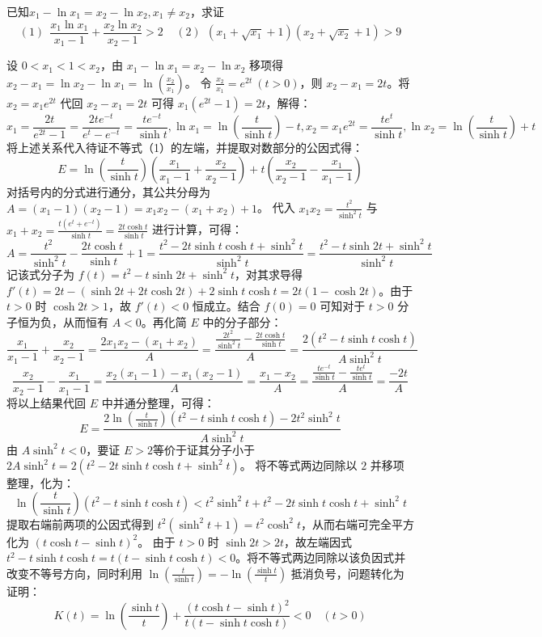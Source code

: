 \newpage
\begin{example}[交点比较]
    已知$x_1-\ln x_1=x_2-\ln x_2,x_1\neq x_2$，求证\[(1)~~\frac{x_{1}\ln x_{1}}{x_{1}-1}+\frac{x_{2}\ln x_{2}}{x_{2}-1}>2~~~~~(2)~~ (x_1+\sqrt{x_1}+1)(x_2+\sqrt{x_2}+1)>9\]
\end{example}
\begin{solution}
设 $0 < x_1 < 1 < x_2$，由 $x_1 - \ln x_1 = x_2 - \ln x_2$ 移项得 $x_2 - x_1 = \ln x_2 - \ln x_1 = \ln\left(\frac{x_2}{x_1}\right)$。
令 $\frac{x_2}{x_1} = e^{2t}\ (t>0)$，则 $x_2 - x_1 = 2t$。将 $x_2 = x_1 e^{2t}$ 代回 $x_2 - x_1 = 2t$ 可得 $x_1(e^{2t}-1) = 2t$，解得：
\[ x_1 = \frac{2t}{e^{2t}-1} = \frac{2t e^{-t}}{e^t - e^{-t}} = \frac{t e^{-t}}{\sinh t},\ln x_1 = \ln\left(\frac{t}{\sinh t}\right) - t, x_2 = x_1 e^{2t} = \frac{t e^t}{\sinh t} ,\ln x_2 = \ln\left(\frac{t}{\sinh t}\right) + t\]
将上述关系代入待证不等式（1）的左端，并提取对数部分的公因式得：
\[ E = \ln\left(\frac{t}{\sinh t}\right) \left( \frac{x_1}{x_1 - 1} + \frac{x_2}{x_2 - 1} \right) + t \left( \frac{x_2}{x_2 - 1} - \frac{x_1}{x_1 - 1} \right) \]
对括号内的分式进行通分，其公共分母为 $A = (x_1 - 1)(x_2 - 1) = x_1 x_2 - (x_1 + x_2) + 1$。
代入 $x_1 x_2 = \frac{t^2}{\sinh^2 t}$ 与 $x_1 + x_2 = \frac{t(e^t+e^{-t})}{\sinh t} = \frac{2t \cosh t}{\sinh t}$ 进行计算，可得：
\[ A = \frac{t^2}{\sinh^2 t} - \frac{2t \cosh t}{\sinh t} + 1 = \frac{t^2 - 2t \sinh t \cosh t + \sinh^2 t}{\sinh^2 t} = \frac{t^2 - t \sinh 2t + \sinh^2 t}{\sinh^2 t} \]
记该式分子为 $f(t) = t^2 - t \sinh 2t + \sinh^2 t$，对其求导得 $f'(t) = 2t - (\sinh 2t + 2t \cosh 2t) + 2\sinh t \cosh t = 2t(1 - \cosh 2t)$。由于 $t > 0$ 时 $\cosh 2t > 1$，故 $f'(t) < 0$ 恒成立。结合 $f(0) = 0$ 可知对于 $t > 0$ 分子恒为负，从而恒有 $A < 0$。再化简 $E$ 中的分子部分：
\[ \frac{x_1}{x_1 - 1} + \frac{x_2}{x_2 - 1} = \frac{2x_1 x_2 - (x_1 + x_2)}{A} = \frac{\frac{2t^2}{\sinh^2 t} - \frac{2t \cosh t}{\sinh t}}{A} = \frac{2(t^2 - t \sinh t \cosh t)}{A \sinh^2 t} \]
\[ \frac{x_2}{x_2 - 1} - \frac{x_1}{x_1 - 1} = \frac{x_2(x_1 - 1) - x_1(x_2 - 1)}{A} = \frac{x_1 - x_2}{A} = \frac{\frac{t e^{-t}}{\sinh t} - \frac{t e^t}{\sinh t}}{A} = \frac{-2t}{A} \]
将以上结果代回 $E$ 中并通分整理，可得：
\[ E = \frac{2 \ln \left( \frac{t}{\sinh t} \right) (t^2 - t \sinh t \cosh t) - 2t^2 \sinh^2 t}{A \sinh^2 t} \]
由 $A \sinh^2 t < 0$，要证 $E > 2$等价于证其分子小于 $2A \sinh^2 t = 2(t^2 - 2t \sinh t \cosh t + \sinh^2 t)$。
将不等式两边同除以 $2$ 并移项整理，化为：
\[ \ln \left( \frac{t}{\sinh t} \right) (t^2 - t \sinh t \cosh t) < t^2\sinh^2 t + t^2 - 2t \sinh t \cosh t + \sinh^2 t \]
提取右端前两项的公因式得到 $t^2(\sinh^2 t + 1) = t^2\cosh^2 t$，从而右端可完全平方化为 $(t \cosh t - \sinh t)^2$。
由于 $t>0$ 时 $\sinh 2t > 2t$，故左端因式 $t^2 - t \sinh t \cosh t = t(t - \sinh t \cosh t) < 0$。将不等式两边同除以该负因式并改变不等号方向，同时利用 $\ln \left( \frac{t}{\sinh t} \right) = - \ln \left( \frac{\sinh t}{t} \right)$ 抵消负号，问题转化为证明：
\[ K(t) = \ln \left( \frac{\sinh t}{t} \right) + \frac{(t \cosh t - \sinh t)^2}{t(t - \sinh t \cosh t)} < 0 \quad (t > 0) \]


\end{solution}
